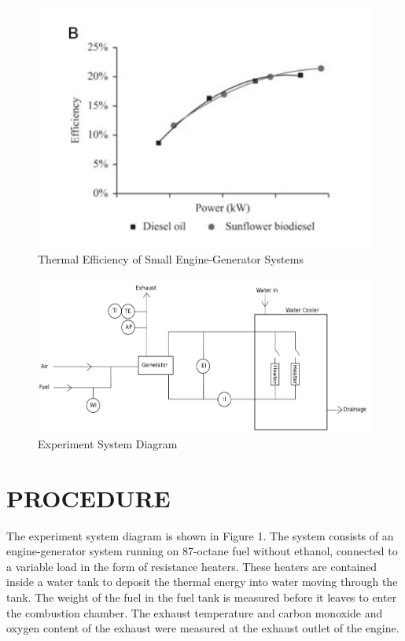 \documentclass[12pt]{article}
\begin{document}
\begin{figure}[h!] %
   \centering
   \includegraphics[width=5in]{thermal_efficiency_reference.jpg} 
   \caption{Thermal Efficiency of Small Engine-Generator Systems}
   \label{fig:example}
\end{figure}


\newpage


\begin{figure}[h!] %
   \centering
   \includegraphics[width=\linewidth]{system_diagram.png} 
   \caption{Experiment System Diagram}
   \label{fig:example}
\end{figure}

\section*{\fontsize{12}{12}\selectfont PROCEDURE}
The experiment system diagram is shown in Figure 1. The system consists of an engine-generator system running on 87-octane fuel without ethanol, connected to a variable load in the form of resistance heaters. These heaters are contained inside a water tank to deposit the thermal energy into water moving through the tank. The weight of the fuel in the fuel tank is measured before it leaves to enter the combustion chamber. The exhaust temperature and carbon monoxide and oxygen content of the exhaust were measured at the exhaust outlet of the engine.
\bigskip
\end{document}
